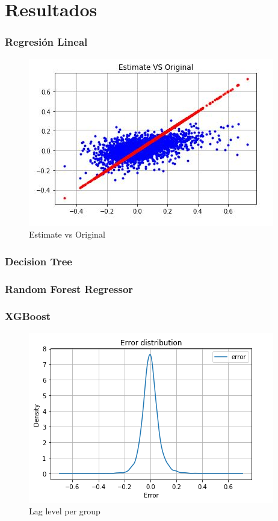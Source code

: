 \newpage
\section{Resultados}
\subsubsection{Regresi\'on Lineal}
\begin{figure}[h!]
	\centering
	\includegraphics[width=1\linewidth]{Figure/RegresionLineal_Results.JPG}
	\caption{Estimate vs Original} 
	\label{fig:TrainingDataSet}
\end{figure}

\subsubsection{Decision Tree}

\subsubsection{Random Forest Regressor}
\subsubsection{XGBoost}

\begin{figure}[h!]
	\centering
	\includegraphics[width=1\linewidth]{Figure/xgbregresor_results.png}
	\caption{Lag level per group} 
	\label{fig:xgbregresor}
\end{figure}

